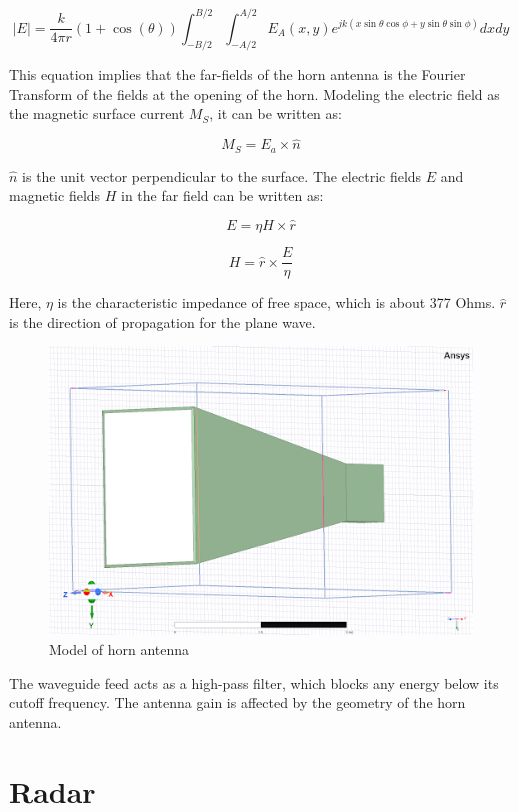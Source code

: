 \documentclass[a4paper,12pt]{report}
\begin{document}
\begin{equation}
  |E| = \frac{k}{4 \pi r}(1 + \cos(\theta))\int_{-B/2}^{B/2}\int_{-A/2}^{A/2}E_A(x,y)e^{jk(x\sin\theta\cos\phi + y\sin\theta\sin\phi)}dxdy
\end{equation}

This equation implies that the far-fields of the horn antenna
is the Fourier Transform of the fields at the opening of the horn.
Modeling the electric field as the magnetic surface current $M_S$,
it can be written as:

\begin{equation}
  M_S = E_a \times \hat{n}
\end{equation}

$\hat{n}$ is the unit vector perpendicular to the surface.
The electric fields $E$ and magnetic fields $H$ in the far field can be written as:

\begin{equation}
  E = \eta H \times \hat{r}
\end{equation}

\begin{equation}
  H = \hat{r} \times \frac{E}{\eta}
\end{equation}

Here, $\eta$ is the characteristic impedance of free space,
which is about 377 Ohms. $\hat{r}$ is the direction of propagation for the plane wave.

\begin{figure}
  \begin{center}
    \includegraphics[clip, keepaspectratio, width=0.5\linewidth]{img/horn_antenna_model.png}
    \caption{Model of horn antenna}
    \label{fig:model_horn_antenna}
  \end{center}
\end{figure}

The waveguide feed acts as a high-pass filter,
which blocks any energy below its cutoff frequency.
The antenna gain is affected by the geometry of the horn antenna.

\section{Radar}
\end{document}
